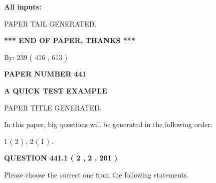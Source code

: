 \documentclass[12pt]{article}
\begin{document}
   
   
   
\noindent{}
   
   
   
   
\noindent\vspace{0.1in}\hspace{-0.08in} {\textbf{\Large{All inputs: }}}
   
   
   
   
   
   
 \vspace{0.2in}
 
   
   
\vspace{2.0in} PAPER TAIL GENERATED.
   
   
   
   
\vspace{1.0in} 
{\textbf{\large{ *** END OF PAPER, THANKS *** }}} 
   
   
\hspace{1.0in} By: 
 239 ( 416 ,  613 )
   
   
   
   
\newpage 
\setcounter{page}{ 
   441001 } 
   
   
   
   
 {\textbf{ \Large{ PAPER NUMBER  441  }}}
   
   
\vspace{0.2in}
   
   
   
   
   
   
   
   
 \vspace{0.2in}
{\LARGE {\textbf{ A QUICK TEST EXAMPLE}}}
   
   
 PAPER TITLE GENERATED.
   
   
   
\vspace{0.2in}
   
In this paper, big questions will be generated in the following order: 
   
   
   1 ( 2 )
 ,
   2 ( 1 )
 .
  
\vspace{0.2in}
  
{\textbf{\Large{QUESTION
441.1 
 ( 2 , 2 , 201 )
}}}
  
  
Please choose the correct one from the following statements.
 
\end{document}
